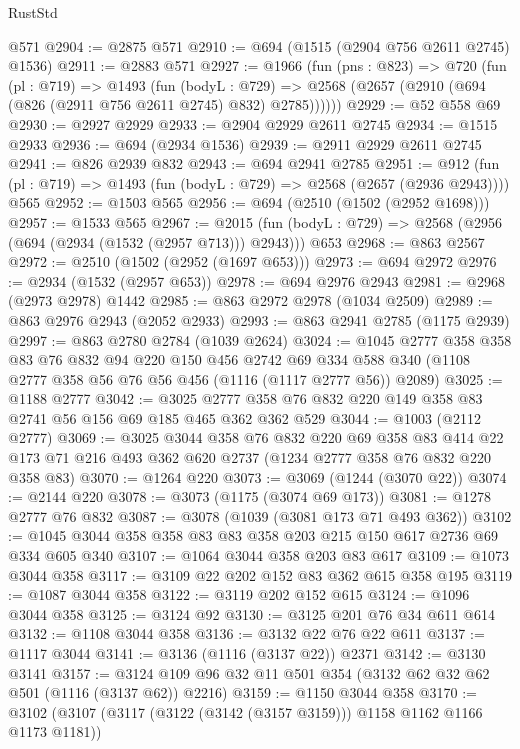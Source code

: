 \begin{lexlean}{RustStd}
\begin{coremodule}
    @571
@2904 := @2875 @571
@2910 := @694 (@1515 (@2904 @756 @2611 @2745) @1536)
@2911 := @2883 @571
@2927 := @1966
    (fun (pns : @823) =>
    @720
      (fun (pl : @719) =>
      @1493
        (fun (bodyL : @729) =>
        @2568 (@2657 (@2910 (@694 (@826 (@2911 @756 @2611 @2745) @832) @2785))))))
@2929 := @52 @558 @69
@2930 := @2927 @2929
@2933 := @2904 @2929 @2611 @2745
@2934 := @1515 @2933
@2936 := @694 (@2934 @1536)
@2939 := @2911 @2929 @2611 @2745
@2941 := @826 @2939 @832
@2943 := @694 @2941 @2785
@2951 := @912 (fun (pl : @719) => @1493 (fun (bodyL : @729) => @2568 (@2657 (@2936 @2943)))) @565
@2952 := @1503 @565
@2956 := @694 (@2510 (@1502 (@2952 @1698)))
@2957 := @1533 @565
@2967 := @2015 (fun (bodyL : @729) => @2568 (@2956 (@694 (@2934 (@1532 (@2957 @713))) @2943))) @653
@2968 := @863 @2567
@2972 := @2510 (@1502 (@2952 (@1697 @653)))
@2973 := @694 @2972
@2976 := @2934 (@1532 (@2957 @653))
@2978 := @694 @2976 @2943
@2981 := @2968 (@2973 @2978) @1442
@2985 := @863 @2972 @2978 (@1034 @2509)
@2989 := @863 @2976 @2943 (@2052 @2933)
@2993 := @863 @2941 @2785 (@1175 @2939)
@2997 := @863 @2780 @2784 (@1039 @2624)
@3024 := @1045
    @2777
    @358
    @358
    @83
    @76
    @832
    @94
    @220
    @150
    @456
    @2742
    @69
    @334
    @588
    @340
    (@1108 @2777 @358 @56 @76 @56 @456 (@1116 (@1117 @2777 @56)) @2089)
@3025 := @1188 @2777
@3042 := @3025 @2777 @358 @76 @832 @220 @149 @358 @83 @2741 @56 @156 @69 @185 @465 @362 @362 @529
@3044 := @1003 (@2112 @2777)
@3069 := @3025
    @3044
    @358
    @76
    @832
    @220
    @69
    @358
    @83
    @414
    @22
    @173
    @71
    @216
    @493
    @362
    @620
    @2737
    (@1234 @2777 @358 @76 @832 @220 @358 @83)
@3070 := @1264 @220
@3073 := @3069 (@1244 (@3070 @22))
@3074 := @2144 @220
@3078 := @3073 (@1175 (@3074 @69 @173))
@3081 := @1278 @2777 @76 @832
@3087 := @3078 (@1039 (@3081 @173 @71 @493 @362))
@3102 := @1045 @3044 @358 @358 @83 @83 @358 @203 @215 @150 @617 @2736 @69 @334 @605 @340
@3107 := @1064 @3044 @358 @203 @83 @617
@3109 := @1073 @3044 @358
@3117 := @3109 @22 @202 @152 @83 @362 @615 @358 @195
@3119 := @1087 @3044 @358
@3122 := @3119 @202 @152 @615
@3124 := @1096 @3044 @358
@3125 := @3124 @92
@3130 := @3125 @201 @76 @34 @611 @614
@3132 := @1108 @3044 @358
@3136 := @3132 @22 @76 @22 @611
@3137 := @1117 @3044
@3141 := @3136 (@1116 (@3137 @22)) @2371
@3142 := @3130 @3141
@3157 := @3124 @109 @96 @32 @11 @501 @354 (@3132 @62 @32 @62 @501 (@1116 (@3137 @62)) @2216)
@3159 := @1150 @3044 @358
@3170 := @3102 (@3107 (@3117 (@3122 (@3142 (@3157 @3159))) @1158 @1162 @1166 @1173 @1181))

\end{coremodule}
\end{lexlean}
